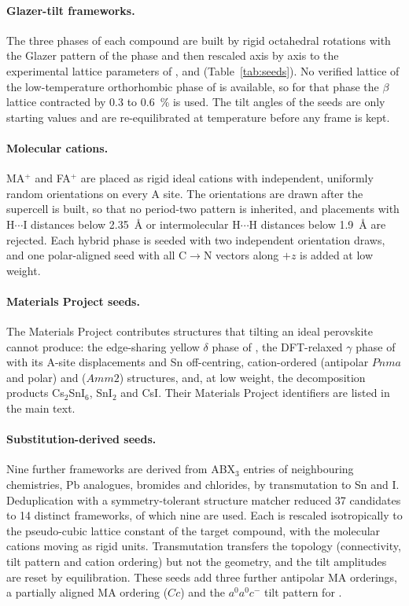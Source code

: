 \paragraph{Glazer-tilt frameworks.} The three phases of each compound are built by rigid octahedral
rotations with the Glazer pattern of the phase\cite{Glazer1972} and then rescaled axis by axis to the
experimental lattice parameters of \CsSnI{},\cite{Chung2012JACS}
\MASnI{}\cite{Mitzi1995JSSC,stoumpos2013semiconducting} and \FASnI{}\cite{schueller2018crystal}
(Table~\ref{tab:seeds}). No verified lattice of the low-temperature orthorhombic phase of \MASnI{} is
available, so for that phase the $\beta$ lattice contracted by 0.3 to \SI{0.6}{\percent} is used. The
tilt angles of the seeds are only starting values and are re-equilibrated at temperature before any
frame is kept.

\paragraph{Molecular cations.} MA$^+$ and FA$^+$ are placed as rigid ideal cations with independent,
uniformly random orientations on every A site. The orientations are drawn after the supercell is
built, so that no period-two pattern is inherited, and placements with H$\cdots$I distances below
\SI{2.35}{\angstrom} or intermolecular H$\cdots$H distances below \SI{1.9}{\angstrom} are rejected.
Each hybrid phase is seeded with two independent orientation draws, and one polar-aligned \MASnI{}
seed with all C$\to$N vectors along $+z$ is added at low weight.

\paragraph{Materials Project seeds.} The Materials Project\cite{mp2013} contributes structures that
tilting an ideal perovskite cannot produce: the edge-sharing yellow $\delta$ phase of \CsSnI{}, the
DFT-relaxed $\gamma$ phase of \CsSnI{} with its A-site displacements and Sn off-centring,
cation-ordered \MASnI{} (antipolar $Pnma$ and polar) and \FASnI{} ($Amm2$) structures, and, at low
weight, the decomposition products Cs$_2$SnI$_6$, SnI$_2$ and CsI. Their Materials Project
identifiers are listed in the main text.

\paragraph{Substitution-derived seeds.} Nine further frameworks are derived from ABX$_3$ entries of
neighbouring chemistries, Pb analogues, bromides and chlorides, by transmutation to Sn and I.
Deduplication with a symmetry-tolerant structure matcher reduced 37 candidates to 14 distinct
frameworks, of which nine are used. Each is rescaled isotropically to the pseudo-cubic lattice
constant of the target compound, with the molecular cations moving as rigid units. Transmutation
transfers the topology (connectivity, tilt pattern and cation ordering) but not the geometry, and the
tilt amplitudes are reset by equilibration. These seeds add three further antipolar MA orderings, a
partially aligned MA ordering ($Cc$) and the $a^0a^0c^-$ tilt pattern for \CsSnI{}.

